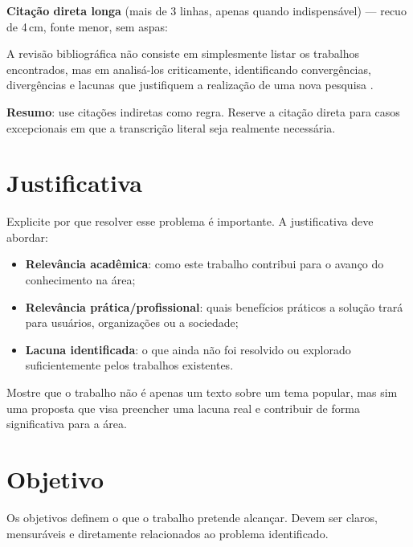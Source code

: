 \documentclass[
    12pt,                %
    openright,           %
    oneside,             %
    a4paper,             %
    english,             %
    brazil               %
]{abntex2}
\begin{document}
{{\vspace{0.2cm}
\textbf{Citação direta longa} (mais de 3 linhas, apenas quando indispensável) --- recuo de 4\,cm, fonte menor, sem aspas:

\begin{citacao}
A revisão bibliográfica não consiste em simplesmente listar os trabalhos encontrados, mas em analisá-los criticamente, identificando convergências, divergências e lacunas que justifiquem a realização de uma nova pesquisa \cite[p.~87]{Wazlawick2020}.
\end{citacao}

\textbf{Resumo}: use citações indiretas como regra. Reserve a citação direta para casos excepcionais em que a transcrição literal seja realmente necessária.
}}

\section{Justificativa}
\label{sec:justificativa}

Explicite por que resolver esse problema é importante. A justificativa deve abordar:

\begin{itemize}
    \item \textbf{Relevância acadêmica}: como este trabalho contribui para o avanço do conhecimento na área;
    \item \textbf{Relevância prática/profissional}: quais benefícios práticos a solução trará para usuários, organizações ou a sociedade;
    \item \textbf{Lacuna identificada}: o que ainda não foi resolvido ou explorado suficientemente pelos trabalhos existentes.
\end{itemize}

Mostre que o trabalho não é apenas um texto sobre um tema popular, mas sim uma proposta que visa preencher uma lacuna real e contribuir de forma significativa para a área.

\section{Objetivo}
\label{sec:objetivo}

Os objetivos definem o que o trabalho pretende alcançar. Devem ser claros, mensuráveis e diretamente relacionados ao problema identificado.
\end{document}
